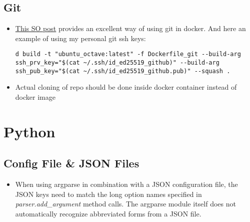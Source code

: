 \documentclass[12pt, a4paper]{article}
\numberwithin{equation}{section}
\theoremstyle{definition}
\theoremstyle{definition}
\begin{document}
	\subsection{Git}	
	\begin{itemize}
		\item \href{https://stackoverflow.com/questions/18136389/using-ssh-keys-inside-docker-container}{This SO post} provides an excellent way of using git in docker. And here an example of using my personal git ssh keys: 
		
		\begin{lstlisting}[style=mystylebash, label=alg:docker_git, xleftmargin=\parindent]
			d build -t "ubuntu_octave:latest" -f Dockerfile_git --build-arg ssh_prv_key="$(cat ~/.ssh/id_ed25519_github)" --build-arg ssh_pub_key="$(cat ~/.ssh/id_ed25519_github.pub)" --squash .
		\end{lstlisting}
		
		\item Actual cloning of repo should be done inside docker container instead of docker image
		
	\end{itemize}

	\newpage 
	
	\section{Python}
	
	\subsection{Config File \& JSON Files}
	
	\begin{itemize}
		\item  When using  argparse  in combination with a JSON configuration file, the JSON keys need to match the long option names specified in \textit{parser.add\_argument} method calls. The argparse module itself does not automatically recognize abbreviated forms from a JSON file.
	\end{itemize} 
\end{document}
